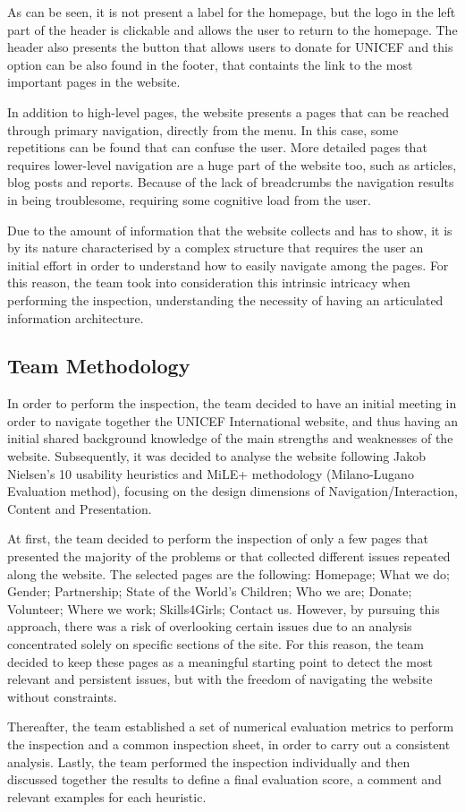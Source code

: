 As can be seen, it is not present a label for the homepage, but the logo in the left part of the header is clickable and allows the user to return to the homepage. The header also presents the button that allows users to donate for UNICEF and this option can be also found in the footer, that containts the link to the most important pages in the website.

In addition to high-level pages, the website presents a pages that can be reached through primary navigation, directly from the menu. In this case, some repetitions can be found that can confuse the user.
More detailed pages that requires lower-level navigation are a huge part of the website too, such as articles, blog posts and reports. Because of the lack of breadcrumbs the navigation results in being troublesome, requiring some cognitive load from the user.

Due to the amount of information that the website collects and has to show, it is by its nature characterised by a complex structure that requires the user an initial effort in order to understand how to easily navigate among the pages. For this reason, the team took into consideration this intrinsic intricacy when performing the inspection, understanding the necessity of having an articulated information architecture.
\clearpage

\subsection{Team Methodology}
In order to perform the inspection, the team decided to have an initial meeting in order to navigate together the UNICEF International website, and thus having an initial shared background knowledge of the main strengths and weaknesses of the website. 
Subsequently, it was decided to analyse the website following Jakob Nielsen's 10 usability heuristics and MiLE+ methodology (Milano-Lugano Evaluation method), focusing on the design dimensions of Navigation/Interaction, Content and Presentation.

At first, the team decided to perform the inspection of only a few pages that presented the majority of the problems or that collected different issues repeated along the website. The selected pages are the following: Homepage; What we do; Gender; Partnership; State of the World’s Children; Who we are; Donate; Volunteer; Where we work; Skills4Girls; Contact us.
However, by pursuing this approach, there was a risk of overlooking certain issues due to an analysis concentrated solely on specific sections of the site. For this reason, the team decided to keep these pages as a meaningful starting point to detect the most relevant and persistent issues, but with the freedom of navigating the website without constraints.

Thereafter, the team established a set of numerical evaluation metrics to perform the inspection and a common inspection sheet, in order to carry out a consistent analysis.
Lastly, the team performed the inspection individually and then discussed together the results to define a final evaluation score, a comment and relevant examples for each heuristic.
\clearpage